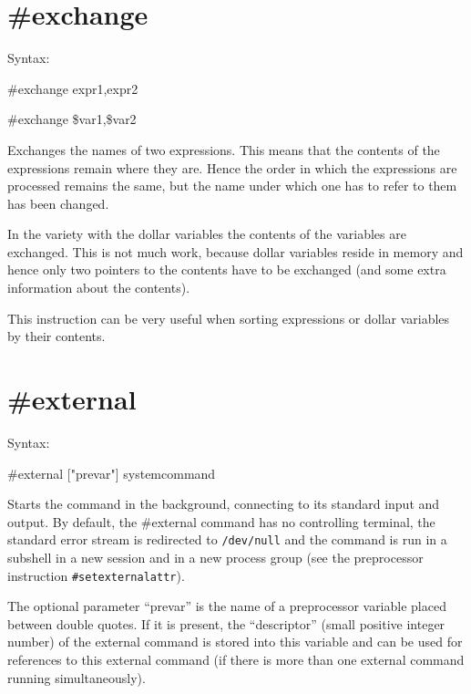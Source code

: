 
\section{\#exchange}
\label{preexchange}

\noindent Syntax:

\#exchange expr1,expr2

\#exchange \$var1,\$var2

\noindent Exchanges the names of two 
expressions. This means that the contents of the 
expressions remain where they are. Hence the order in which the expressions 
are processed remains the same, but the name under which one has to refer 
to them has been changed.

In the variety with the dollar variables the contents of 
the variables are exchanged. This is not much work, because dollar 
variables reside in memory and hence only two pointers to the contents have 
to be exchanged (and some extra information about the contents).

This instruction can be very useful when sorting expressions or dollar 
variables by their contents.


\section{\#external}
\label{preexternal}

\noindent Syntax:

\#external ["prevar"] systemcommand

\noindent Starts the command in the background, 
connecting to its standard 
input and output. By default, 
the \#external command has no controlling terminal, the standard error stream 
is redirected to \verb|/dev/null| and the command is run in a subshell in a 
new session and in a new process group (see the preprocessor instruction 
\verb|#setexternalattr|).

The optional parameter ``prevar'' is the name of a preprocessor variable 
placed between double quotes. If it is present, the ``descriptor'' (small 
positive integer number) of the external command is stored into this 
variable and can be used for references to this external command (if there 
is more than one external command running simultaneously).

